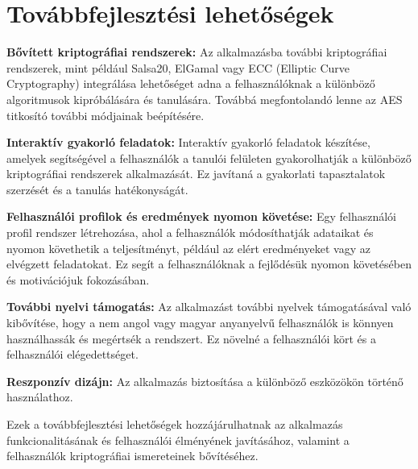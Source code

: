 \chapter{Továbbfejlesztési lehetőségek}


\textbf{Bővített kriptográfiai rendszerek:} Az alkalmazásba további kriptográfiai rendszerek, mint például Salsa20, ElGamal vagy ECC (Elliptic Curve Cryptography) integrálása lehetőséget adna a felhasználóknak a különböző algoritmusok kipróbálására és tanulására. Továbbá megfontolandó lenne az AES titkosító további módjainak beépítésére.

\textbf{Interaktív gyakorló feladatok:} Interaktív gyakorló feladatok készítése, amelyek segítségével a felhasználók a tanulói felületen gyakorolhatják a különböző kriptográfiai rendszerek alkalmazását. Ez javítaná a gyakorlati tapasztalatok szerzését és a tanulás hatékonyságát.

\textbf{Felhasználói profilok és eredmények nyomon követése:} Egy felhasználói profil rendszer létrehozása, ahol a felhasználók módosíthatják adataikat és nyomon követhetik a teljesítményt, például az elért eredményeket vagy az elvégzett feladatokat. Ez segít a felhasználóknak a fejlődésük nyomon követésében és motivációjuk fokozásában.

\textbf{További nyelvi támogatás:} Az alkalmazást további nyelvek támogatásával való kibővítése, hogy a nem angol vagy magyar anyanyelvű felhasználók is könnyen használhassák és megértsék a rendszert. Ez növelné a felhasználói kört és a felhasználói elégedettséget.

\textbf{Reszponzív dizájn:} Az alkalmazás biztosítása a különböző eszközökön történő használathoz.

\vspace{10pt}
Ezek a továbbfejlesztési lehetőségek hozzájárulhatnak az alkalmazás funkcionalitásának és felhasználói élményének javításához, valamint a felhasználók kriptográfiai ismereteinek bővítéséhez.